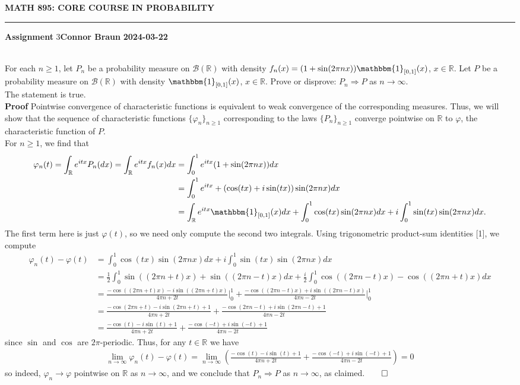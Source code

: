 \documentclass[10pt]{article}
\newcommand{\bp}[1]{\left({#1}\right)}
\newcommand{\mbb}[1]{\mathbb{#1}}
\newcommand{\1}[1]{\mathbbm{1}_{#1}}
\newcommand{\mc}[1]{\mathcal{#1}}
\begin{document}
    \begin{center}
        {\bf\large{MATH 895: CORE COURSE IN PROBABILITY}}
        \smallskip
        \hrule
        \smallskip
        {\bf Assignment} 3\hfill {\bf Connor Braun} \hfill {\bf 2024-03-22}
    \end{center}
    \\[5pt]
    For each $n\geq 1$, let $P_n$ be a probability measure on $\mc{B}(\mbb{R})$ with density $f_n(x)=(1+\sin(2\pi nx))\1{[0,1]}(x)$, $x\in\mbb{R}$. Let $P$ be a probability measure on $\mc{B}(\mbb{R})$ with density $\1{[0,1]}(x)$, $x\in\mbb{R}$. Prove or disprove: $P_n\Longrightarrow P$ as $n\rightarrow\infty$.\\[5pt]
    The statement is true.\\[5pt]
    {\bf Proof}\hspace{5pt} Pointwise convergence of characteristic functions is equivalent to weak convergence of the corresponding measures. Thus, we will show that the sequence of characteristic functions $\{\varphi_n\}_{n\geq 1}$ corresponding to the laws $\{P_n\}_{n\geq 1}$ converge pointwise on $\mbb{R}$ to $\varphi$, the characteristic function of $P$.\\[5pt]
    For $n\geq 1$, we find that
    \begin{align*}
        \varphi_n(t)=\int_\mbb{R}e^{itx}P_n(dx)=\int_\mbb{R}e^{itx}f_n(x)dx&=\int_0^1e^{itx}(1+\sin(2\pi nx))dx\\
        &=\int_0^1e^{itx}+(\cos(tx)+i\sin(tx))\sin(2\pi nx)dx\\
        &=\int_\mbb{R}e^{itx}\1{[0,1]}(x)dx+\int_0^1\cos(tx)\sin(2\pi nx)dx+i\int_0^1\sin(tx)\sin(2\pi nx)dx.
    \end{align*}
    The first term here is just $\varphi(t)$, so we need only compute the second two integrals. Using trigonometric product-sum identities [1], we compute
    \begin{align*}
        \varphi_n(t)-\varphi(t)&=\int_0^1\cos(tx)\sin(2\pi nx)dx+i\int_0^1\sin(tx)\sin(2\pi nx)dx\\
        &=\frac{1}{2}\int_0^1\sin((2\pi n+t)x)+\sin((2\pi n-t)x)dx+\frac{i}{2}\int_0^1\cos((2\pi n-t)x)-\cos((2\pi n+t)x)dx\\
        &=\frac{-\cos((2\pi n+t)x)-i\sin((2\pi n+t)x)}{4\pi n+2t}\bigg|_0^1+\frac{-\cos((2\pi n-t)x)+i\sin((2\pi n -t)x)}{4\pi n-2t}\bigg|_0^1\\
        &=\frac{-\cos(2\pi n+t)-i\sin(2\pi n+t)+1}{4\pi n+2t}+\frac{-\cos(2\pi n-t)+i\sin(2\pi n -t)+1}{4\pi n-2t}\\
        &=\frac{-\cos(t)-i\sin(t)+1}{4\pi n+2t}+\frac{-\cos(-t)+i\sin(-t)+1}{4\pi n-2t}
    \end{align*}
    since $\sin$ and $\cos$ are $2\pi$-periodic. Thus, for any $t\in\mbb{R}$ we have
    \begin{align*}
        \lim_{n\rightarrow\infty}\varphi_n(t)-\varphi(t)=\lim_{n\rightarrow\infty}\bp{\frac{-\cos(t)-i\sin(t)+1}{4\pi n+2t}+\frac{-\cos(-t)+i\sin(-t)+1}{4\pi n-2t}}=0
    \end{align*}
    so indeed, $\varphi_n\rightarrow\varphi$ pointwise on $\mbb{R}$ as $n\rightarrow\infty$, and we conclude that $P_n\Longrightarrow P$ as $n\rightarrow\infty$, as claimed.\hfill{$\qed$\\[5pt]}
\end{document}
